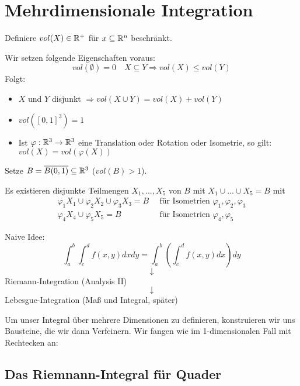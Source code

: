 \documentclass[main.tex]{subfiles}
\begin{document}
\chapter{Mehrdimensionale Integration}

\begin{Beispiel}[Grundproblem]
  Definiere $vol(X) \in \mathbb{R}^+$ für $x \subseteq \mathbb{R}^n$ beschränkt.

  Wir setzen folgende Eigenschaften voraus:
  $$vol(\emptyset) = 0 \quad X \subseteq Y \Rightarrow vol(X)\leq vol(Y)$$
  Folgt:
  \begin{itemize}
    \item $X$ und $Y$ disjunkt $\Rightarrow vol(X \cup Y) = vol(X) + vol(Y)$
    \item $vol([0,1]^3) = 1$
    \item Ist $\varphi: \mathbb{R}^3 \to \mathbb{R}^3$ eine Translation oder Rotation oder Isometrie, so gilt: $vol(X) = vol(\varphi(X))$
  \end{itemize}
\end{Beispiel}

\begin{Theorem}
  Setze $B = \overline{B(0,1)} \subseteq \mathbb{R}^3$ ($vol(B) > 1$).

  Es existieren disjunkte Teilmengen $X_1,...,X_5$ von $B$ mit $X_1 \cup ... \cup X_5 = B$ mit
  $$\begin{aligned}
    \varphi_1 X_1 \cup \varphi_2 X_2 \cup \varphi_3 X_3 = B & \, \text{ für Isometrien } \varphi_1,\varphi_2,\varphi_3 \\
    \varphi_4 X_4 \cup \varphi_5 X_5 = B & \, \text{ für Isometrien } \varphi_4,\varphi_5
  \end{aligned}$$
\end{Theorem}


\begin{Bemerkung}
  Naive Idee:
  $$\int_a^b \int_c^d f(x,y)dxdy = \int_a^b\left(\int_c^df(x,y)dx \right)dy$$
  $$\downarrow$$
  Riemann-Integration (Analysis II)
  $$\downarrow$$
  Lebesgue-Integration (Maß und Integral, später)
\end{Bemerkung}

Um unser Integral über mehrere Dimensionen zu definieren, konstruieren wir uns Bausteine, die wir dann Verfeinern. Wir fangen wie im 1-dimensionalen Fall mit Rechtecken an:


\section{Das Riemnann-Integral für Quader}
\end{document}
